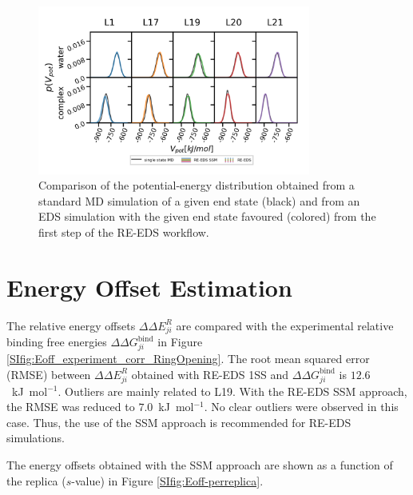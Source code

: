 \begin{figure}[h]
\centering
     \includegraphics[width=0.8\textwidth]{fig/results/ringOpening/paramExploration/single_state_energy_sampling.png}
    \caption{Comparison of the potential-energy distribution obtained from a standard MD simulation of a given end state (black) and from an EDS simulation with the given end state favoured (colored) from the first step of the RE-EDS workflow.}
     \label{fig:CHK1_set2_stateOptimization_EnergyDistribution}
\end{figure}


\section{Energy Offset Estimation}
The relative energy offsets $\Delta \Delta E^R_{ji}$ are compared with the experimental relative binding free energies $\Delta \Delta G^\text{bind}_{ji}$ in Figure \ref{SIfig:Eoff_experiment_corr_RingOpening}. 
The root mean squared error (RMSE) between $\Delta \Delta E^R_{ji}$ obtained with RE-EDS 1SS and $\Delta \Delta G^\text{bind}_{ji}$ is $12.6$~kJ~mol$^{-1}$. Outliers are mainly related to L19.
With the RE-EDS SSM approach, the RMSE was reduced to $7.0$~kJ~mol$^{-1}$. No clear outliers were observed in this case. Thus, the use of the SSM approach is recommended for RE-EDS simulations.

The energy offsets obtained with the SSM approach are shown as a function of the replica ($s$-value) in Figure \ref{SIfig:Eoff-perreplica}. 

